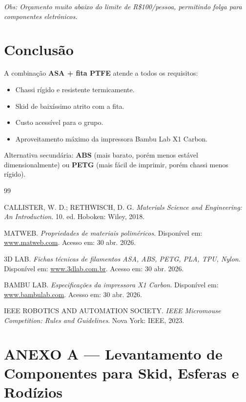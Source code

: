 \documentclass[12pt, a4paper]{article}
\begin{document}
\textit{Obs: Orçamento muito abaixo do limite de R\$100/pessoa, permitindo folga para componentes eletrônicos.}

\section{Conclusão}

A combinação \textbf{ASA + fita PTFE} atende a todos os requisitos:
\begin{itemize}
    \item Chassi rígido e resistente termicamente.
    \item Skid de baixíssimo atrito com a fita.
    \item Custo acessível para o grupo.
    \item Aproveitamento máximo da impressora Bambu Lab X1 Carbon.
\end{itemize}

Alternativa secundária: \textbf{ABS} (mais barato, porém menos estável dimensionalmente) ou \textbf{PETG} (mais fácil de imprimir, porém chassi menos rígido).

\newpage

\begin{thebibliography}{99}

 CALLISTER, W. D.; RETHWISCH, D. G. \textit{Materials Science and Engineering: An Introduction}. 10. ed. Hoboken: Wiley, 2018.

 MATWEB. \textit{Propriedades de materiais poliméricos}. Disponível em: \url{www.matweb.com}. Acesso em: 30 abr. 2026.

 3D LAB. \textit{Fichas técnicas de filamentos ASA, ABS, PETG, PLA, TPU, Nylon}. Disponível em: \url{www.3dlab.com.br}. Acesso em: 30 abr. 2026.

 BAMBU LAB. \textit{Especificações da impressora X1 Carbon}. Disponível em: \url{www.bambulab.com}. Acesso em: 30 abr. 2026.

 IEEE ROBOTICS AND AUTOMATION SOCIETY. \textit{IEEE Micromouse Competition: Rules and Guidelines}. Nova York: IEEE, 2023.

\end{thebibliography}

\newpage

\section*{ANEXO A — Levantamento de Componentes para Skid, Esferas e Rodízios}
\end{document}
